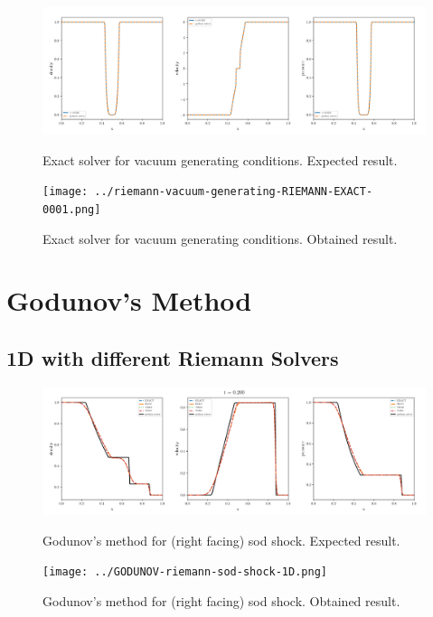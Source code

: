    \begin{figure}[htbp]
        \centering
        \includegraphics[width=.9\textwidth]{./figures/riemann-vacuum-generating-RIEMANN-EXACT-overplotted.png}%
        \caption{Exact solver for vacuum generating conditions. Expected result.}
        \texttt{[image: ../riemann-vacuum-generating-RIEMANN-EXACT-0001.png]}%
        \caption{Exact solver for vacuum generating conditions. Obtained result.}
    \end{figure}












\clearpage
\section{Godunov's Method}

\subsection{1D with different Riemann Solvers}

    \begin{figure}[htbp]
        \centering
        \includegraphics[width=.9\textwidth]{./figures/GODUNOV-riemann-sod-shock-1D.png}%
        \caption{Godunov's method for (right facing) sod shock. Expected result.}
        \texttt{[image: ../GODUNOV-riemann-sod-shock-1D.png]}%
        \caption{Godunov's method for (right facing) sod shock. Obtained result.}
    \end{figure}


